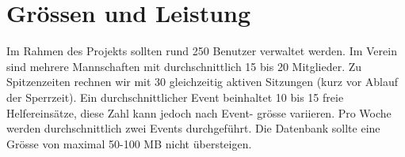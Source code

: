 \chapter{Grössen und Leistung}
Im Rahmen des Projekts sollten rund 250 Benutzer verwaltet werden. Im Verein sind mehrere Mannschaften mit durchschnittlich 15 bis 20 Mitglieder. Zu Spitzenzeiten rechnen wir mit 30 gleichzeitig aktiven Sitzungen (kurz vor Ablauf der Sperrzeit).
Ein durchschnittlicher Event beinhaltet 10 bis 15 freie Helfereinsätze, diese Zahl kann jedoch nach Event- grösse variieren. Pro Woche werden durchschnittlich zwei Events durchgeführt.
Die Datenbank sollte eine Grösse von maximal 50-100 MB nicht übersteigen.
